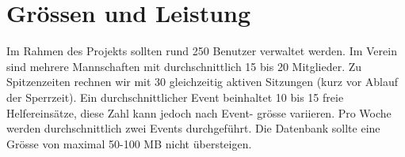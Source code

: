 \chapter{Grössen und Leistung}
Im Rahmen des Projekts sollten rund 250 Benutzer verwaltet werden. Im Verein sind mehrere Mannschaften mit durchschnittlich 15 bis 20 Mitglieder. Zu Spitzenzeiten rechnen wir mit 30 gleichzeitig aktiven Sitzungen (kurz vor Ablauf der Sperrzeit).
Ein durchschnittlicher Event beinhaltet 10 bis 15 freie Helfereinsätze, diese Zahl kann jedoch nach Event- grösse variieren. Pro Woche werden durchschnittlich zwei Events durchgeführt.
Die Datenbank sollte eine Grösse von maximal 50-100 MB nicht übersteigen.
